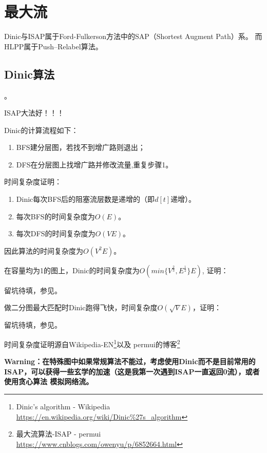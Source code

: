\section{最大流}
Dinic与ISAP属于Ford-Fulkerson方法中的SAP（Shortest Augment Path）系。
而HLPP属于Push–Relabel算法。
\subsection{Dinic算法}
。

ISAP大法好！！！

Dinic的计算流程如下：
\begin{enumerate}
	\item BFS建分层图，若找不到增广路则退出；
	\item DFS在分层图上找增广路并修改流量,重复步骤1。
\end{enumerate}

时间复杂度证明：

\begin{enumerate}
	\item \begin{lemma}
		Dinic每次BFS后的阻塞流层数是递增的（即$d[t]$递增）。
	\end{lemma}
	\item 每次BFS的时间复杂度为$O(E)$。
	\item 每次DFS的时间复杂度为$O(VE)$。
\end{enumerate}

因此算法的时间复杂度为$O(V^2E)$。

在容量均为1的图上，Dinic的时间复杂度为$O(min \{ V^\frac{2}{3},E^\frac{1}{2} \} E)$,
证明：

留坑待填，参见\cite{NFTGC}。

做二分图最大匹配时Dinic跑得飞快，时间复杂度$O(\sqrt V E)$，证明：

留坑待填，参见\cite{DSNA}。


时间复杂度证明源自Wikipedia-EN\footnote{
	Dinic's algorithm - Wikipedia
	\url{https://en.wikipedia.org/wiki/Dinic\%27s\_algorithm}}以及
	permui的博客\footnote{ 最大流算法-ISAP - permui
		\url{https://www.cnblogs.com/owenyu/p/6852664.html}}

{\bfseries Warning：在特殊图中如果常规算法不能过，考虑使用Dinic而不是目前常用的
ISAP，可以获得一些玄学的加速（这是我第一次遇到ISAP一直返回0流），或者使用贪心算法
模拟网络流。}

